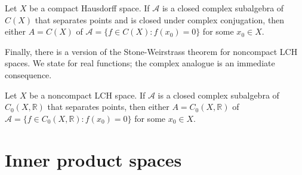 \documentclass{article}
\theoremstyle{definition}
\numberwithin{equation}{section}
\newcommand{\R}{\mathbb{R}}
\begin{document}
		\begin{thm}
			Let $X$ be a compact Hausdorff space. If $\mathcal{A}$ is a closed complex subalgebra of $C(X)$ that separates points and is closed under complex conjugation, then either $A=C(X)$ of $\mathcal{A}=\{f\in C(X):f(x_0)=0\}$ for some $x_0\in X$.
		\end{thm}
		Finally, there is a version of the Stone-Weirstrass theorem for noncompact LCH spaces. We state for real functions; the complex analogue is an immediate consequence.
		\begin{thm}
			Let $X$ be a noncompact LCH space. If $\mathcal{A}$ is a closed complex subalgebra of $C_0(X,\R)$ that separates points, then either $A=C_0(X,\R)$ of $\mathcal{A}=\{f\in C_0(X,\R):f(x_0)=0\}$ for some $x_0\in X$.
		\end{thm}

\clearpage
\section{Inner product spaces}
\end{document}
